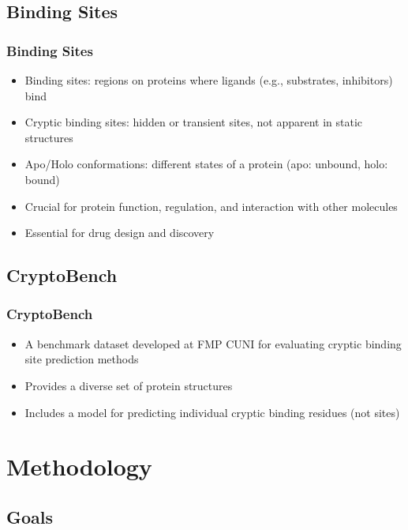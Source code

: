\documentclass[aspectratio=169]{beamer}
\begin{document}
\subsection{Binding Sites}

\begin{frame}
  \frametitle{Binding Sites}
  
  \begin{itemize}
    \item Binding sites: regions on proteins where ligands (e.g., substrates, inhibitors) bind
    \item Cryptic binding sites: hidden or transient sites, not apparent in static structures
    \item Apo/Holo conformations: different states of a protein (apo: unbound, holo: bound)
  \end{itemize}
  
  \begin{itemize}
    \item Crucial for protein function, regulation, and interaction with other molecules
    \item Essential for drug design and discovery
  \end{itemize}

\end{frame}

\subsection{CryptoBench}

\begin{frame}
  \frametitle{CryptoBench}
  \begin{itemize}
    \item A benchmark dataset developed at FMP CUNI for evaluating cryptic binding site prediction methods
    \item Provides a diverse set of protein structures
    \item Includes a model for predicting individual cryptic binding residues (not sites)
  \end{itemize}

\end{frame}

\section{Methodology}
\subsection{Goals}
\end{document}
